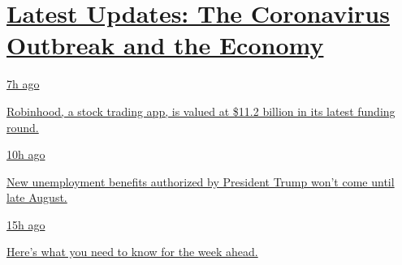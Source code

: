 \hypertarget{latest-updates-the-coronavirus-outbreak-and-the-economy}{%
\section{\texorpdfstring{\href{https://www.nytimes3xbfgragh.onion/live/2020/08/17/business/stock-market-today-coronavirus?action=click\&pgtype=Article\&state=default\&region=MAIN_CONTENT_1\&context=storylines_live_updates}{Latest
Updates: The Coronavirus Outbreak and the
Economy}}{Latest Updates: The Coronavirus Outbreak and the Economy}}\label{latest-updates-the-coronavirus-outbreak-and-the-economy}}

\href{https://www.nytimes3xbfgragh.onion/live/2020/08/17/business/stock-market-today-coronavirus?action=click\&pgtype=Article\&state=default\&region=MAIN_CONTENT_1\&context=storylines_live_updates\#robinhood-a-stock-trading-app-is-valued-at-11-2-billion-in-its-latest-funding-round}{7h
ago}

\href{https://www.nytimes3xbfgragh.onion/live/2020/08/17/business/stock-market-today-coronavirus?action=click\&pgtype=Article\&state=default\&region=MAIN_CONTENT_1\&context=storylines_live_updates\#robinhood-a-stock-trading-app-is-valued-at-11-2-billion-in-its-latest-funding-round}{Robinhood,
a stock trading app, is valued at \$11.2 billion in its latest funding
round.}

\href{https://www.nytimes3xbfgragh.onion/live/2020/08/17/business/stock-market-today-coronavirus?action=click\&pgtype=Article\&state=default\&region=MAIN_CONTENT_1\&context=storylines_live_updates\#new-unemployment-benefits-authorized-by-president-trump-wont-come-until-late-august}{10h
ago}

\href{https://www.nytimes3xbfgragh.onion/live/2020/08/17/business/stock-market-today-coronavirus?action=click\&pgtype=Article\&state=default\&region=MAIN_CONTENT_1\&context=storylines_live_updates\#new-unemployment-benefits-authorized-by-president-trump-wont-come-until-late-august}{New
unemployment benefits authorized by President Trump won't come until
late August.}

\href{https://www.nytimes3xbfgragh.onion/live/2020/08/17/business/stock-market-today-coronavirus?action=click\&pgtype=Article\&state=default\&region=MAIN_CONTENT_1\&context=storylines_live_updates\#heres-what-you-need-to-know-for-the-week-ahead}{15h
ago}

\href{https://www.nytimes3xbfgragh.onion/live/2020/08/17/business/stock-market-today-coronavirus?action=click\&pgtype=Article\&state=default\&region=MAIN_CONTENT_1\&context=storylines_live_updates\#heres-what-you-need-to-know-for-the-week-ahead}{Here's
what you need to know for the week ahead.}

